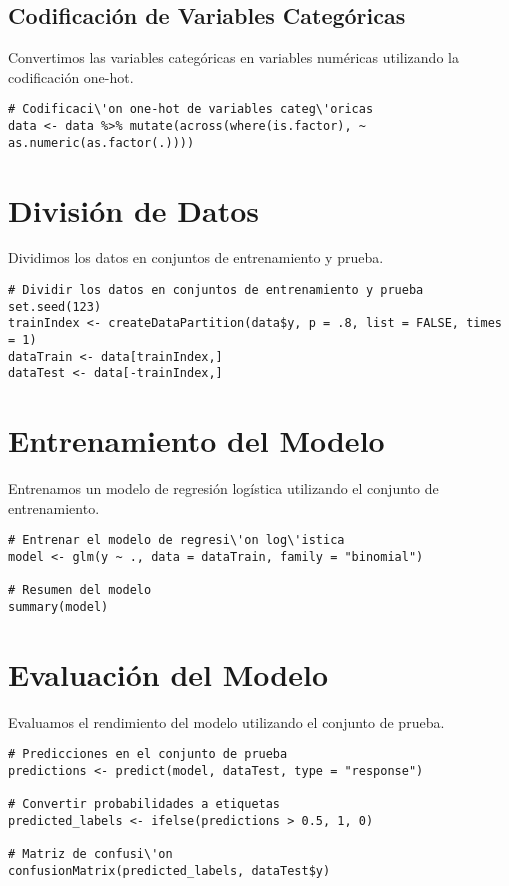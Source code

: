 \documentclass[a4paper]{report} %
\begin{document}
\subsection{Codificaci\'on de Variables Categ\'oricas}

Convertimos las variables categ\'oricas en variables num\'ericas utilizando la codificaci\'on one-hot.

\begin{verbatim}
# Codificaci\'on one-hot de variables categ\'oricas
data <- data %>% mutate(across(where(is.factor), ~ as.numeric(as.factor(.))))
\end{verbatim}

\section{Divisi\'on de Datos}

Dividimos los datos en conjuntos de entrenamiento y prueba.

\begin{verbatim}
# Dividir los datos en conjuntos de entrenamiento y prueba
set.seed(123)
trainIndex <- createDataPartition(data$y, p = .8, list = FALSE, times = 1)
dataTrain <- data[trainIndex,]
dataTest <- data[-trainIndex,]
\end{verbatim}

\section{Entrenamiento del Modelo}

Entrenamos un modelo de regresi\'on log\'istica utilizando el conjunto de entrenamiento.

\begin{verbatim}
# Entrenar el modelo de regresi\'on log\'istica
model <- glm(y ~ ., data = dataTrain, family = "binomial")

# Resumen del modelo
summary(model)
\end{verbatim}

\section{Evaluaci\'on del Modelo}

Evaluamos el rendimiento del modelo utilizando el conjunto de prueba.

\begin{verbatim}
# Predicciones en el conjunto de prueba
predictions <- predict(model, dataTest, type = "response")

# Convertir probabilidades a etiquetas
predicted_labels <- ifelse(predictions > 0.5, 1, 0)

# Matriz de confusi\'on
confusionMatrix(predicted_labels, dataTest$y)
\end{verbatim}
\end{document}
